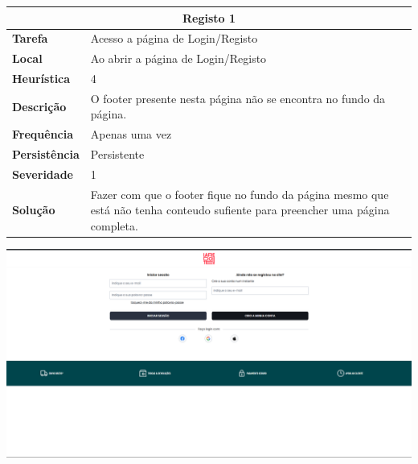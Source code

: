 \documentclass[a4paper,12pt]{article}
\begin{document}
\begin{center}

\begin{table}[h!]
    \centering
    \begin{tabular}{|m{3cm}|m{12cm}|}
    \hline
    \multicolumn{2}{|c|}{\textbf{Registo 1}} \\ \hline
    \textbf{Tarefa}       & Acesso a página de Login/Registo \\ \hline
    \textbf{Local}        & Ao abrir a página de Login/Registo \\ \hline
    \textbf{Heurística}   & 4 \\ \hline
    \textbf{Descrição}    & O footer presente nesta página não se encontra no fundo da página. \\ \hline
    \textbf{Frequência}   & Apenas uma vez \\ \hline
    \textbf{Persistência} & Persistente \\ \hline
    \textbf{Severidade}   & 1 \\ \hline
    \textbf{Solução}      & Fazer com que o footer fique no fundo da página mesmo que está não tenha conteudo sufiente para preencher uma página completa. \\ \hline
    \end{tabular}
\end{table}

\vspace{0.5cm}
\includegraphics[width=\textwidth, keepaspectratio]{heuristics/01footer_registo.png}
    


\end{center}
\end{document}
